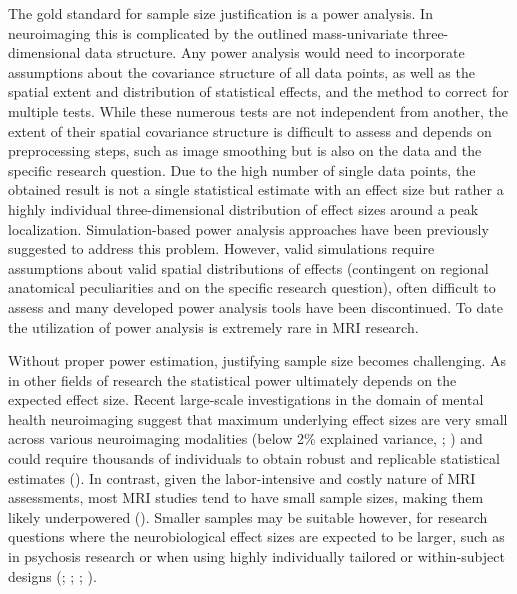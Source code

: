 \documentclass[
  letterpaper,
  DIV=11,
  openany,
  fontsize=12pt,
  parskip=half,
  headings=big,
  numbers=noenddot,
  titlepage=false]{scrreprt}
\begin{document}
The gold standard for sample size justification is a power analysis. In
neuroimaging this is complicated by the outlined mass-univariate
three-dimensional data structure. Any power analysis would need to
incorporate assumptions about the covariance structure of all data
points, as well as the spatial extent and distribution of statistical
effects, and the method to correct for multiple tests. While these
numerous tests are not independent from another, the extent of their
spatial covariance structure is difficult to assess and depends on
preprocessing steps, such as image smoothing but is also on the data and
the specific research question. Due to the high number of single data
points, the obtained result is not a single statistical estimate with an
effect size but rather a highly individual three-dimensional
distribution of effect sizes around a peak localization.
Simulation-based power analysis approaches have been previously
suggested to address this problem. However, valid simulations require
assumptions about valid spatial distributions of effects (contingent on
regional anatomical peculiarities and on the specific research
question), often difficult to assess and many developed power analysis
tools have been discontinued. To date the utilization of power analysis
is extremely rare in MRI research.

Without proper power estimation, justifying sample size becomes
challenging. As in other fields of research the statistical power
ultimately depends on the expected effect size. Recent large-scale
investigations in the domain of mental health neuroimaging suggest that
maximum underlying effect sizes are very small across various
neuroimaging modalities (below 2\% explained variance,
;
) and could require
thousands of individuals to obtain robust and replicable statistical
estimates (). In
contrast, given the labor-intensive and costly nature of MRI
assessments, most MRI studies tend to have small sample sizes, making
them likely underpowered (). Smaller samples may be suitable however, for research questions
where the neurobiological effect sizes are expected to be larger, such
as in psychosis research or when using highly individually tailored or
within-subject designs (;
;
;
).
\end{document}

